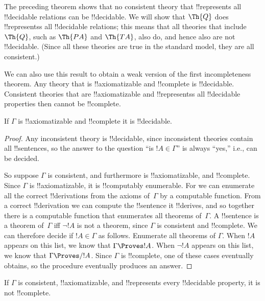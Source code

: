 \documentclass[../../../include/open-logic-section]{subfiles}
\begin{document}
\begin{explain}
The preceding theorem shows that no consistent theory that
!!{represents} all !!{decidable} relations can be !!{decidable}. We
will show that $\Th{Q}$ does !!{represents}s all !!{decidable}
relations; this means that all theories that include $\Th{Q}$, such as
$\Th{PA}$ and $\Th{TA}$, also do, and hence also are not
!!{decidable}. (Since all these theories are true in the standard
model, they are all consistent.)

We can also use this result to obtain a weak version of the first
incompleteness theorem.  Any theory that is !!{axiomatizable} and
!!{complete} is !!{decidable}.  Consistent theories that are
!!{axiomatizable} and !!{represents}s all !!{decidable} properties
then cannot be !!{complete}.
\end{explain}

\begin{thm}
If $\Gamma$ is !!{axiomatizable} and !!{complete} it is !!{decidable}.
\end{thm}

\begin{proof}
Any inconsistent theory is !!{decidable}, since inconsistent theories
contain all !!{sentence}s, so the answer to the question ``is $!A \in
\Gamma$'' is always ``yes,'' i.e., can be decided.

So suppose $\Gamma$ is consistent, and furthermore is
!!{axiomatizable}, and !!{complete}. Since $\Gamma$ is
!!{axiomatizable}, it is !!{computably enumerable}. For we can
enumerate all the correct !!{derivation}s from the axioms of~$\Gamma$
by a computable function. From a correct !!{derivation} we can compute
the !!{sentence} it !!{derive}s, and so together there is a computable
function that enumerates all theorems of~$\Gamma$.  A !!{sentence} is
a theorem of~$\Gamma$ iff $\lnot !A$ is not a theorem, since $\Gamma$
is consistent and !!{complete}.  We can therefore decide if $!A \in
\Gamma$ as follows. Enumerate all theorems of $\Gamma$. When $!A$
appears on this list, we know that $\Gamma \Proves !A$. When $\lnot
!A$ appears on this list, we know that $\Gamma \Proves/ !A$.  Since
$\Gamma$ is !!{complete}, one of these cases eventually obtains, so
the procedure eventually produces an answer.
\end{proof}

\begin{cor}
If $\Gamma$ is consistent, !!{axiomatizable}, and !!{represents} every
!!{decidable} property, it is not !!{complete}.
\end{cor}
\end{document}
